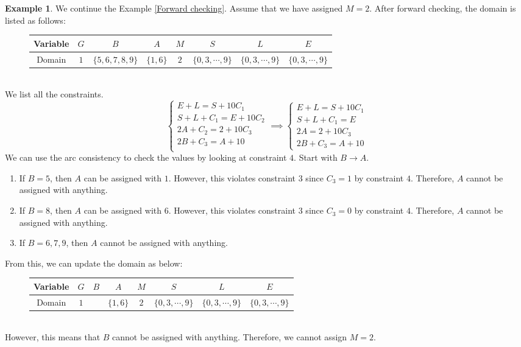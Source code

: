 \documentclass{article}
\theoremstyle{definition}
\newtheorem{example}{Example}[definition]
\begin{document}
\newpage
\begin{example}
	We continue the Example \ref{Forward checking}. Assume that we have assigned $M=2$. After forward checking, the domain is listed as follows:
	\begin{figure}[h]
		\centering
		\begin{tabular}{|c||c|c|c|c|c|c|c|}
			\hline
			Variable & $G$ & $B$ & $A$ & $M$ & $S$ & $L$ & $E$\\
			\hline
			Domain & $1$ & $\{5,6,7,8,9\}$ & $\{1,6\}$ & $2$ & $\{0,3,\cdots,9\}$ & $\{0,3,\cdots,9\}$ & $\{0,3,\cdots,9\}$\\
			\hline
		\end{tabular}
	\end{figure}\\
	We list all the constraints.
	\begin{equation*}
		\begin{cases}
			E+L=S+10C_{1}\\
			S+L+C_{1}=E+10C_{2}\\
			2A+C_{2}=2+10C_{3}\\
			2B+C_{3}=A+10\\
		\end{cases}\implies\begin{cases}
			E+L=S+10C_{1}\\
			S+L+C_{1}=E\\
			2A=2+10C_{3}\\
			2B+C_{3}=A+10
		\end{cases}
	\end{equation*}
	We can use the arc consistency to check the values by looking at constraint $4$. Start with $B\to A$.
	\begin{enumerate}
		\item If $B=5$, then $A$ can be assigned with $1$. However, this violates constraint $3$ since $C_{3}=1$ by constraint $4$. Therefore, $A$ cannot be assigned with anything. 
		\item If $B=8$, then $A$ can be assigned with $6$. However, this violates constraint $3$ since $C_{3}=0$ by constraint $4$. Therefore, $A$ cannot be assigned with anything.
		\item If $B=6,7,9$, then $A$ cannot be assigned with anything. 
	\end{enumerate}
	From this, we can update the domain as below:
	\begin{figure}[h]
		\centering
		\begin{tabular}{|c||c|c|c|c|c|c|c|}
			\hline
			Variable & $G$ & $B$ & $A$ & $M$ & $S$ & $L$ & $E$\\
			\hline
			Domain & $1$ &  & $\{1,6\}$ & $2$ & $\{0,3,\cdots,9\}$ & $\{0,3,\cdots,9\}$ & $\{0,3,\cdots,9\}$\\
			\hline
		\end{tabular}
	\end{figure}\\
	However, this means that $B$ cannot be assigned with anything. Therefore, we cannot assign $M=2$.
\end{example}
\end{document}
